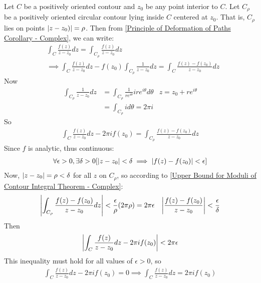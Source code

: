 \documentclass[12pt, english]{book}
\makeatletter
\renewenvironment{proof}[1][\proofname]{\par
	\pushQED{\qed}%
	\normalfont \topsep6\p@\@plus6\p@\relax
	\list{}{%
		\settowidth{\leftmargin}{\itshape\proofname:\hskip\labelsep}%
		\setlength{\labelwidth}{0pt}%
		\setlength{\itemindent}{-\leftmargin}%
	}%
	\item[\hskip\labelsep\itshape#1\@addpunct{:}]\ignorespaces
}{%
	\popQED\endlist\@endpefalse
}
\makeatother
\begin{document}
	\begin{proof}
		Let  \(C\) be a positively oriented contour and \(z_0\) be any point interior to \(C\). Let \(C_\rho\) be a positively oriented circular contour lying inside \(C\) centered at \(z_0\). That is, \(C_\rho\) lies on points \(\abs{z - z_0)} = \rho\). Then from \cref{Principle of Deformation of Paths Corollary - Complex}, we can write: 
		\begin{align*}
			&\int_{C} \frac{f(z)}{z-z_0} dz = \int_{C_\rho} \frac{f(z)}{z-z_0} dz  \\
			&\implies \int_{C} \frac{f(z)}{z-z_0} dz - f(z_0) \int_{C_\rho} \frac{1}{z-z_0} dz = \int_{C} \frac{f(z) - f(z_0)}{z-z_0} dz 
		\end{align*}
		Now
		\begin{align*}
			\int_{C_\rho} \frac{1}{z-z_0} dz 
			&= \int_{C_\rho} \frac{1}{re^{i\theta}} ire^{i\theta} d\theta & z = z_0 + re^{i\theta} \\
			&= \int_{C_\rho} i d\theta = 2\pi i
		\end{align*}
		So
		\begin{align*}
			\int_{C} \frac{f(z)}{z - z_0}dz - 2\pi i f(z_0) = \int_{C_\rho} \frac{f(z) - f(z_0)}{z - z_0} dz
		\end{align*}
		Since \(f\) is analytic, thus continuous:
		\begin{align*}
			\forall \epsilon>0, \exists \delta>0 [\abs{z-z_0}<\delta \implies \abs{f(z) - f(z_0)}<\epsilon]
		\end{align*}
		Now, \(\abs{z - z_0} = \rho < \delta\) for all \(z\) on \(C_\rho\), so according to \cref{Upper Bound for Moduli of Contour Integral Theorem - Complex}:
		\begin{align*}
			\abs{\int_{C_\rho} \frac{f(z) - f(z_0)}{z - z_0} dz} &< \frac{\epsilon}{\rho} (2 \pi \rho) = 2 \pi \epsilon & \abs{\frac{f(z) - f(z_0)}{z - z_0}} < \frac{\epsilon}{\delta}
		\end{align*}
		Then
		\begin{align*}
			\abs{\int_{C} \frac{f(z)}{z - z_0}dz - 2\pi i f(z_0)} < 2 \pi \epsilon
		\end{align*}
		This inequality must hold for all values of \(\epsilon > 0\), so
		\begin{align*}
			\int_{C} \frac{f(z)}{z - z_0}dz - 2\pi i f(z_0) = 0 \implies \int_{C} \frac{f(z)}{z - z_0} dz = 2 \pi i f(z_0)
		\end{align*}
	\end{proof}
	
	
\end{document}
